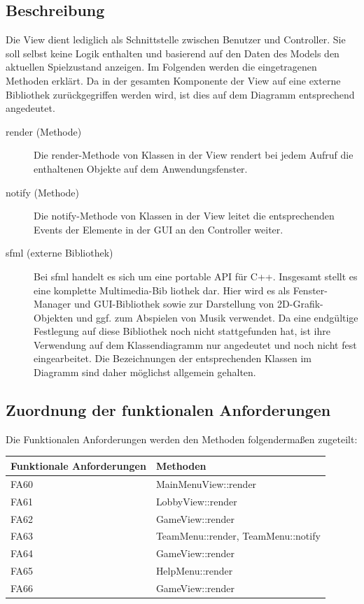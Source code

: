 \subsection{Beschreibung}
	Die View dient lediglich als Schnittstelle zwischen Benutzer und Controller. Sie soll selbst keine Logik enthalten und basierend auf den Daten des Models den aktuellen Spielzustand anzeigen. 
	Im Folgenden werden die eingetragenen Methoden erklärt. Da in der gesamten Komponente der View auf eine externe Bibliothek zurückgegriffen werden wird, ist dies auf dem Diagramm entsprechend angedeutet.
\begin{description}
	\item[render (Methode)]
		Die render-Methode von Klassen in der View rendert bei jedem Aufruf die enthaltenen Objekte auf dem Anwendungsfenster.
	\item[notify (Methode)]
		Die notify-Methode von Klassen in der View leitet die entsprechenden Events der Elemente in der GUI an den Controller weiter.
	
	\item[sfml (externe Bibliothek)]
		Bei sfml handelt es sich um eine portable API für C++. Insgesamt stellt es eine komplette Multimedia-Bib liothek dar. Hier wird es als Fenster-Manager und GUI-Bibliothek sowie zur Darstellung von 2D-Grafik-Objekten und ggf. zum Abspielen von Musik verwendet.
		Da eine endgültige Festlegung auf diese Bibliothek noch nicht stattgefunden hat, ist ihre Verwendung auf dem Klassendiagramm nur angedeutet und noch nicht fest eingearbeitet. Die Bezeichnungen der entsprechenden Klassen im Diagramm sind daher möglichst allgemein gehalten.
\end{description}


\subsection{Zuordnung der funktionalen Anforderungen}
Die Funktionalen Anforderungen werden den Methoden folgendermaßen zugeteilt:
\begin{center}
	\begin{tabular}{|l|l|}
		\hline
		\textbf{Funktionale Anforderungen} & \textbf{Methoden}\\\hline
		FA60 & MainMenuView::render\\
		FA61& LobbyView::render\\\hline
		FA62 & GameView::render\\\hline
		FA63 & TeamMenu::render, TeamMenu::notify\\\hline
		FA64 & GameView::render\\\hline
		FA65 & HelpMenu::render\\\hline
		FA66 & GameView::render\\\hline
		
	\end{tabular}
\end{center}

